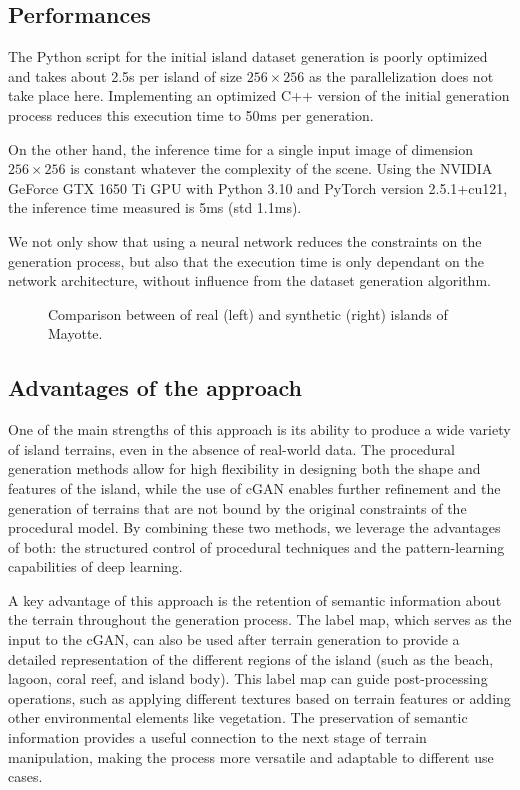 \subsection{Performances}
\label{sec:coral-island_performances}

The Python script for the initial island dataset generation is poorly optimized and takes about 2.5s per island of size $256 \times 256$ as the parallelization does not take place here. Implementing an optimized C++ version of the initial generation process reduces this execution time to 50ms per generation.

On the other hand, the inference time for a single input image of dimension $256 \times 256$ is constant whatever the complexity of the scene. Using the NVIDIA GeForce GTX 1650 Ti GPU with Python 3.10 and PyTorch version 2.5.1+cu121, the inference time measured is 5ms (std 1.1ms). 

We not only show that using a neural network reduces the constraints on the generation process, but also that the execution time is only dependant on the network architecture, without influence from the dataset generation algorithm. 



\begin{figure}[H]
    \caption{Comparison between of real (left) and synthetic (right) islands of Mayotte.}
\end{figure}


\subsection{Advantages of the approach}
\label{sec:coral-island_advantages}

One of the main strengths of this approach is its ability to produce a wide variety of island terrains, even in the absence of real-world data. The procedural generation methods allow for high flexibility in designing both the shape and features of the island, while the use of cGAN enables further refinement and the generation of terrains that are not bound by the original constraints of the procedural model. By combining these two methods, we leverage the advantages of both: the structured control of procedural techniques and the pattern-learning capabilities of deep learning.

A key advantage of this approach is the retention of semantic information about the terrain throughout the generation process. The label map, which serves as the input to the cGAN, can also be used after terrain generation to provide a detailed representation of the different regions of the island (such as the beach, lagoon, coral reef, and island body). This label map can guide post-processing operations, such as applying different textures based on terrain features or adding other environmental elements like vegetation. The preservation of semantic information provides a useful connection to the next stage of terrain manipulation, making the process more versatile and adaptable to different use cases.

